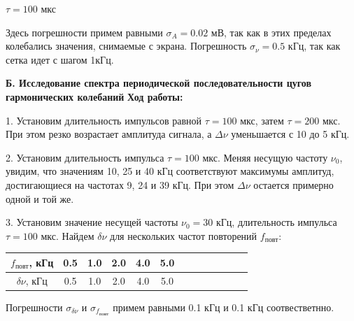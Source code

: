 \documentclass[14pt]{article}
\begin{document}
\vspace{1cm}
$\tau = 100$ мкс

Здесь погрешности примем равными $\sigma_A = 0.02$ мВ, так как в этих пределах колебались значения, снимаемые с экрана. Погрешность $\sigma_\nu = 0.5$ кГц, так как сетка идет с шагом 1кГц. 

\newpage
\textbf{Б. Исследование спектра периодической последовательности цугов гармонических колебаний}
\vspace{1cm}
\textbf{Ход работы:}

1. Установим длительность импульсов равной $\tau = 100$ мкс, затем $\tau = 200$ мкс. При этом резко возрастает амплитуда сигнала, а $\Delta\nu$ уменьшается с 10 до 5 кГц.

2. Установим длительность импульса $\tau = 100$ мкс. Меняя несущую частоту $\nu_0$, увидим, что значениям 10, 25 и 40 кГц соответствуют максимумы амплитуд, достигающиеся на частотах 9, 24 и 39 кГц. При этом $\Delta\nu$ остается примерно одной и той же.

3. Установим значение несущей частоты $\nu_0 = 30$ кГц, длительность импульса $\tau = 100$ мкс. Найдем $\delta\nu$ для нескольких частот повторений $f_{\text{повт}}$:	

\begin{center}
\begin{tabular}{|c|c|c|c|c|c|c|c|c|c|c|c|c|}
\hline
$f_{\text{повт}}$, кГц	&	0.5	&	1.0	&	2.0	&	4.0	&	5.0	\\
\hline
$\delta\nu$, кГц		&	0.5	&	1.0	&	2.0	&	4.0	&	5.0	\\
\hline
\end{tabular}
\end{center}

Погрешности $\sigma_{\delta\nu}$ и $\sigma_{f_{\text{повт}}}$ примем равными 0.1 кГц и 0.1 кГц соотвестветнно.
\end{document}
